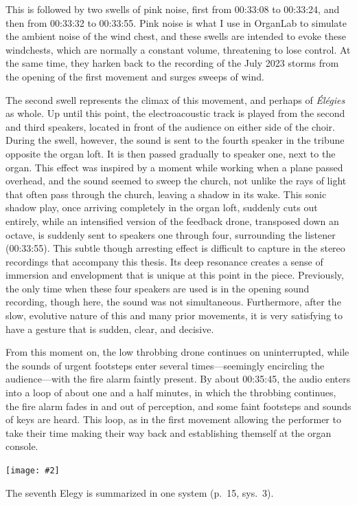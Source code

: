 \documentclass[12pt,twoside,maitrise]{dms_ks}
\newcommand{\customincludeexamples}[4][]{%
    \begin{example}[H]
        \centering
        \texttt{[image: \#2]}
        \caption{#4}
	\label{#3} 
    \end{example}
}
\theoremstyle{definition}
\begin{document}
{This is followed by two swells of pink noise, first from 00:33:08 to 00:33:24, and then from 00:33:32 to 00:33:55.
Pink noise is what I use in OrganLab to simulate the ambient noise of the wind chest, and these swells are intended to evoke these windchests, which are normally a constant volume, threatening to lose control.
At the same time, they harken back to the recording of the July 2023 storms from the opening of the first movement and surges sweeps of wind.

The second swell represents the climax of this movement, and perhaps of \textit{Élégies} as whole.
Up until this point, the electroacoustic track is played from the second and third speakers, located in front of the audience on either side of the choir.
During the swell, however, the sound is sent to the fourth speaker in the tribune opposite the organ loft.
It is then passed gradually to speaker one, next to the organ.
This effect was inspired by a moment while working when a plane passed overhead, and the sound seemed to sweep the church, not unlike the rays of light that often pass through the church, leaving a shadow in its wake. 
This sonic shadow play, once arriving completely in the organ loft, suddenly cuts out entirely, while an intensified version of the feedback drone, transposed down an octave, is suddenly sent to speakers one through four, surrounding the listener (00:33:55).
This subtle though arresting effect is difficult to capture in the stereo recordings that accompany this thesis.
Its deep resonance creates a sense of immersion and envelopment that is unique at this point in the piece. 
Previously, the only time when these four speakers are used is in the opening sound recording, though here, the sound was not simultaneous. 
Furthermore, after the slow, evolutive nature of this and many prior movements, it is very satisfying to have a gesture that is sudden, clear, and decisive. 

From this moment on, the low throbbing drone continues on uninterrupted, while the sounds of urgent footsteps enter several times---seemingly encircling the audience---with the fire alarm faintly present. 
By about 00:35:45, the audio enters into a loop of about one and a half minutes, in which the throbbing continues, the fire alarm fades in and out of perception, and some faint footsteps and sounds of keys are heard.  
This loop, as in the first movement allowing the performer to take their time making their way back and establishing themself at the organ console.

\customincludeexamples[width=\textwidth]{7e_1}{ex:7e_1}{The seventh Elegy is summarized in one system (p.~15, sys.~3).}

}
\end{document}
